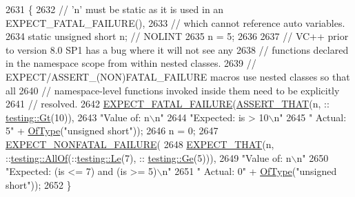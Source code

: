 \begin{DoxyCode}
2631                                                            \{
2632   \textcolor{comment}{// 'n' must be static as it is used in an EXPECT\_FATAL\_FAILURE(),}
2633   \textcolor{comment}{// which cannot reference auto variables.}
2634   \textcolor{keyword}{static} \textcolor{keywordtype}{unsigned} \textcolor{keywordtype}{short} n;  \textcolor{comment}{// NOLINT}
2635   n = 5;
2636 
2637   \textcolor{comment}{// VC++ prior to version 8.0 SP1 has a bug where it will not see any}
2638   \textcolor{comment}{// functions declared in the namespace scope from within nested classes.}
2639   \textcolor{comment}{// EXPECT/ASSERT\_(NON)FATAL\_FAILURE macros use nested classes so that all}
2640   \textcolor{comment}{// namespace-level functions invoked inside them need to be explicitly}
2641   \textcolor{comment}{// resolved.}
2642   \hyperlink{gtest-spi_8h_a819a3fd7f8b8cf24b6f1b3a26708973d}{EXPECT\_FATAL\_FAILURE}(\hyperlink{gmock-matchers_8h_a41d888579850c16583baea33ee8d057e}{ASSERT\_THAT}(n, ::
      \hyperlink{namespacetesting_a493fc1bafd7b3945ba06ace80e74b0d5}{testing::Gt}(10)),
2643                        \textcolor{stringliteral}{"Value of: n\(\backslash\)n"}
2644                        \textcolor{stringliteral}{"Expected: is > 10\(\backslash\)n"}
2645                        \textcolor{stringliteral}{"  Actual: 5"} + \hyperlink{namespacetesting_1_1gmock__matchers__test_a5d48d2ef7ca374de369c5f0a30e32343}{OfType}(\textcolor{stringliteral}{"unsigned short"}));
2646   n = 0;
2647   \hyperlink{gtest-spi_8h_a8376fd6821bd88fd806697355e79e138}{EXPECT\_NONFATAL\_FAILURE}(
2648       \hyperlink{gmock-matchers_8h_ac31e206123aa702e1152bb2735b31409}{EXPECT\_THAT}(n, ::\hyperlink{namespacetesting_af7618e8606c1cb45738163688944e2b7}{testing::AllOf}(::\hyperlink{namespacetesting_a2e33596921b80a7fdaff3f62bf18a478}{testing::Le}(7), ::
      \hyperlink{namespacetesting_a42bb19b42d7830b972973a103d5e00f2}{testing::Ge}(5))),
2649       \textcolor{stringliteral}{"Value of: n\(\backslash\)n"}
2650       \textcolor{stringliteral}{"Expected: (is <= 7) and (is >= 5)\(\backslash\)n"}
2651       \textcolor{stringliteral}{"  Actual: 0"} + \hyperlink{namespacetesting_1_1gmock__matchers__test_a5d48d2ef7ca374de369c5f0a30e32343}{OfType}(\textcolor{stringliteral}{"unsigned short"}));
2652 \}
\end{DoxyCode}
